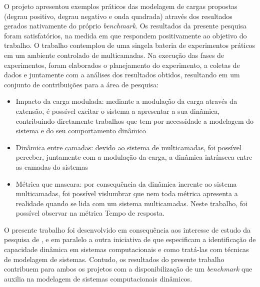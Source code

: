 O projeto apresentou exemplos práticos das modelagem de cargas propostas (degrau positivo, degrau negativo e onda quadrada) através dos resultados gerados nativamente do próprio \textit{benchmark}. Os resultados da presente pesquisa foram satisfatórios, na medida em que respondem positivamente ao objetivo do trabalho. O trabalho contemplou de uma singela bateria de experimentos práticos em um ambiente controlado de multicamadas. Na execução das fases de experimentos, foram elaborados o planejamento do experimento, a coletas de dados e juntamente com a análises dos resultados obtidos, resultando em um conjunto de contribuições para a área de pesquisa:
\begin{itemize}
	\item Impacto da carga modulada: mediante a modulação da carga através da extensão, é possível excitar o sistema a apresentar a sua dinâmica, contribuindo diretamente trabalhos que tem por necessidade a modelagem do sistema e do seu comportamento dinâmico
	\item Dinâmica entre camadas: devido ao sistema de multicamadas, foi possível perceber, juntamente com a modulação da carga, a dinâmica intrínseca entre as camadas do sistemas 
	\item Métrica que mascara: por consequência da dinâmica inerente ao sistema multicamadas, foi possível vislumbrar que nem toda métrica apresenta a realidade quando se lida com um sistema multicamadas. Neste trabalho, foi possível observar na métrica Tempo de resposta.
\end{itemize} 

O presente trabalho foi desenvolvido em consequência aos interesse de estudo da pesquisa de , e em paralelo a outra iniciativa de  que especificam a identificação de capacidade dinâmica em sistemas computacionais e como tratá-las com técnicas de modelagem de sistemas. Contudo, os resultados do presente trabalho contribuem para ambos os projetos com a disponibilização de um \textit{benchmark} que auxilia na modelagem de sistemas computacionais dinâmicos.

